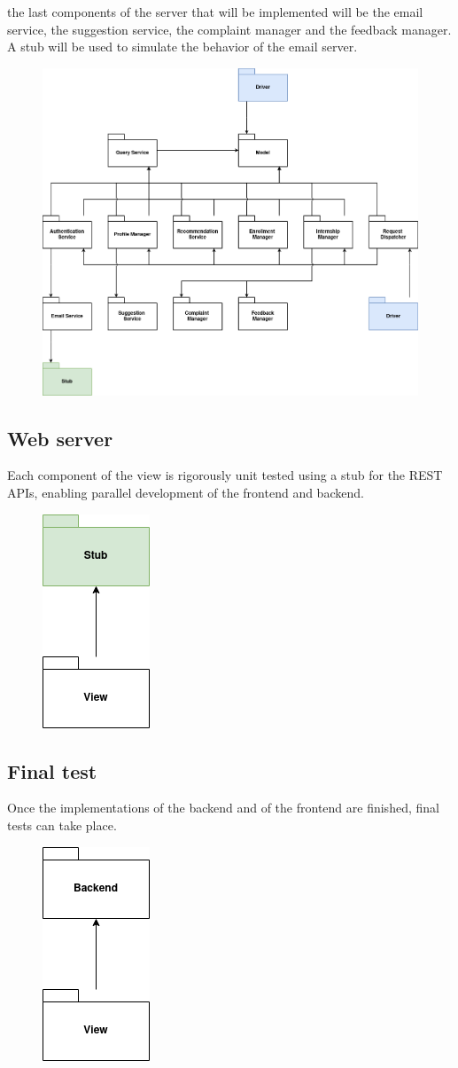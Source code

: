 the last components of the server that will be implemented will be the email service, the suggestion service, the complaint manager and the feedback manager.
A stub will be used to simulate the behavior of the email server.

\begin{figure}[H]
    \centering
    \includegraphics[width=0.8\linewidth]{../../assets/implementation-plan-diagrams/implementation-plan-4.png}
\end{figure}

\subsection{Web server}

Each component of the view is rigorously unit tested using a stub for the REST APIs, enabling parallel development of the frontend and backend.

\begin{figure}[H]
    \centering
    \includegraphics[width=0.1\linewidth]{../../assets/implementation-plan-diagrams/implementation-plan-5.png}
\end{figure}

\subsection{Final test}

Once the implementations of the backend and of the frontend are finished, final tests can take place.

\begin{figure}[H]
    \centering
    \includegraphics[width=0.1\linewidth]{../../assets/implementation-plan-diagrams/implementation-plan-6.png}
\end{figure}

